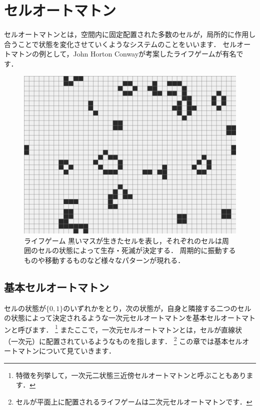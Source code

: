 \documentclass[dvipdfmx]{jsarticle}
\theoremstyle{definition}
\begin{document}
\section{セルオートマトン}

セルオートマトンとは，空間内に固定配置された多数のセルが，局所的に作用し合うことで状態を変化させていくようなシステムのことをいいます．
セルオートマトンの例として，John Horton Conwayが考案したライフゲームが有名です．

\begin{figure}[ht]
\begin{center}
    \includegraphics[scale=0.22]{figure/lifegame.png}
\end{center}
\caption{ライフゲーム\newline
{\footnotesize 黒いマスが生きたセルを表し，それぞれのセルは周囲のセルの状態によって生存・死滅が決定する．
周期的に振動するものや移動するものなど様々なパターンが現れる．}}
\label{pic_lifegame}
\end{figure}


\subsection{基本セルオートマトン}

セルの状態が$\{0, 1\}$のいずれかをとり，次の状態が，自身と隣接する二つのセルの状態によって決定されるような一次元セルオートマトンを基本セルオートマトンと呼びます．
\footnote{特徴を列挙して，一次元二状態三近傍セルオートマトンと呼ぶこともあります．}
またここで，一次元セルオートマトンとは，セルが直線状（一次元）に配置されているようなものを指します．
\footnote{セルが平面上に配置されるライフゲームは二次元セルオートマトンです．}
この章では基本セルオートマトンについて見ていきます．
\end{document}
